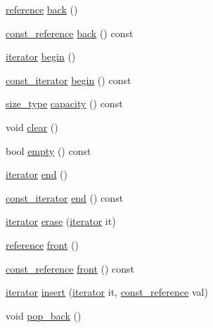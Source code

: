 \begin{DoxyCompactItemize}
\item 
\hyperlink{classmy__deque_a4c34c14f397b7676445b37c87003116b}{reference} \hyperlink{classmy__deque_a1d9aadb5bedc29da86d4323587cd5e4d}{back} ()
\item 
\hyperlink{classmy__deque_ad50d8b378580088cf77fa43f0640e49c}{const\-\_\-reference} \hyperlink{classmy__deque_ac273f9574a95af619b9f0dcc0d2e89d0}{back} () const 
\item 
\hyperlink{classmy__deque_1_1iterator}{iterator} \hyperlink{classmy__deque_aef8cac69d47cb1c274896b82ba8f453a}{begin} ()
\item 
\hyperlink{classmy__deque_1_1const__iterator}{const\-\_\-iterator} \hyperlink{classmy__deque_a8612539eff4ee446f85ffb30abf91a69}{begin} () const 
\item 
\hyperlink{classmy__deque_a61e5e5317fe72a381ce4d45f09544b02}{size\-\_\-type} \hyperlink{classmy__deque_a6402ba96543ef0e121dc72e4429b048f}{capacity} () const 
\item 
void \hyperlink{classmy__deque_aa29f90c63cde532f5fc169e8e66b514c}{clear} ()
\item 
bool \hyperlink{classmy__deque_a2b4f029c47afbdbf057639c5a6816d6c}{empty} () const 
\item 
\hyperlink{classmy__deque_1_1iterator}{iterator} \hyperlink{classmy__deque_a2576ee71790ebe55ac4200c506540bb5}{end} ()
\item 
\hyperlink{classmy__deque_1_1const__iterator}{const\-\_\-iterator} \hyperlink{classmy__deque_af465c3f8483634e4e656d90f8d0d88fb}{end} () const 
\item 
\hyperlink{classmy__deque_1_1iterator}{iterator} \hyperlink{classmy__deque_a08d9ba017ff4874a682d1cb58dd46cb7}{erase} (\hyperlink{classmy__deque_1_1iterator}{iterator} it)
\item 
\hyperlink{classmy__deque_a4c34c14f397b7676445b37c87003116b}{reference} \hyperlink{classmy__deque_a0eae28af0ffdd813d1f94f57d393fdf8}{front} ()
\item 
\hyperlink{classmy__deque_ad50d8b378580088cf77fa43f0640e49c}{const\-\_\-reference} \hyperlink{classmy__deque_a0f1239043b7339b8237a0c8bc663be6b}{front} () const 
\item 
\hyperlink{classmy__deque_1_1iterator}{iterator} \hyperlink{classmy__deque_acce29d6597777d85a6745bd937d9b353}{insert} (\hyperlink{classmy__deque_1_1iterator}{iterator} it, \hyperlink{classmy__deque_ad50d8b378580088cf77fa43f0640e49c}{const\-\_\-reference} val)
\item 
void \hyperlink{classmy__deque_a63cc9691ee90701693e948246311c498}{pop\-\_\-back} ()

\end{DoxyCompactItemize}
